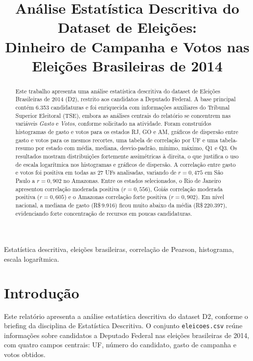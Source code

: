 \documentclass[conference]{IEEEtran}
\title{Análise Estatística Descritiva do Dataset de Eleições:\\
Dinheiro de Campanha e Votos nas Eleições Brasileiras de 2014}
\author{
  \IEEEauthorblockN{Heitor Teixeira - 2651254}
  \IEEEauthorblockA{
    \textit{MBA: Ciência de dados}\\
    UNIFOR\\
    Fortaleza, Brasil\\
    heitor.mba.unifor@gmail.com
  }
}
\begin{document}
\maketitle

\begin{abstract}
Este trabalho apresenta uma análise estatística descritiva do dataset de
Eleições Brasileiras de 2014 (D2), restrito aos candidatos a Deputado
Federal. A base principal contém 6.353 candidaturas e foi enriquecida com
informações auxiliares do Tribunal Superior Eleitoral (TSE), embora as
análises centrais do relatório se concentrem nas variáveis \textit{Gasto} e
\textit{Votos}, conforme solicitado na atividade. Foram construídos
histogramas de gasto e votos para os estados RJ, GO e AM, gráficos de
dispersão entre gasto e votos para os mesmos recortes, uma tabela de correlação
por UF e uma tabela-resumo por estado com média, mediana, desvio-padrão,
mínimo, máximo, Q1 e Q3. Os resultados mostram distribuições fortemente
assimétricas à direita, o que justifica o uso de escala logarítmica nos
histogramas e gráficos de dispersão. A correlação entre gasto e votos foi
positiva em todas as 27 UFs analisadas, variando de $r = 0{,}475$ em São
Paulo a $r = 0{,}902$ no Amazonas. Entre os estados selecionados, o Rio de
Janeiro apresentou correlação moderada positiva ($r = 0{,}556$), Goiás
correlação moderada positiva ($r = 0{,}605$) e o Amazonas correlação forte
positiva ($r = 0{,}902$). Em nível nacional, a mediana de gasto
(R\$\,9.916) ficou muito abaixo da média (R\$\,220.397), evidenciando forte
concentração de recursos em poucas candidaturas.
\end{abstract}

\begin{IEEEkeywords}
Estatística descritiva, eleições brasileiras, correlação de Pearson,
histograma, escala logarítmica.
\end{IEEEkeywords}

\section{Introdução}

Este relatório apresenta a análise estatística descritiva do dataset D2,
conforme o briefing da disciplina de Estatística Descritiva. O conjunto
\texttt{eleicoes.csv} reúne informações sobre candidatos a Deputado Federal
nas eleições brasileiras de 2014, com quatro campos centrais: UF, número do
candidato, gasto de campanha e votos obtidos.
\end{document}
